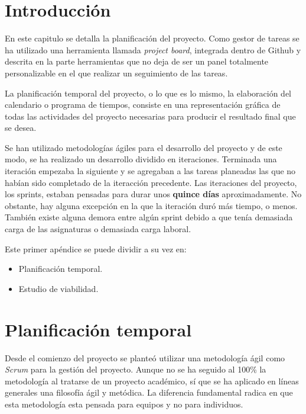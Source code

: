 
\section{Introducción}\label{introduccion-plan}
En este capitulo se detalla la planificación del proyecto. Como gestor de tareas se ha utilizado una herramienta llamada \textit{project board}, integrada dentro de Github y descrita en la parte  herramientas que no deja de ser un panel totalmente personalizable en el que realizar un seguimiento de las tareas. 

La planificación temporal del proyecto, o lo que es lo mismo, la elaboración del calendario o programa de tiempos, consiste en una representación gráfica de todas las actividades del proyecto necesarias para producir el resultado final que se desea.

Se han utilizado metodologías ágiles para el desarrollo del proyecto y de este modo, se ha realizado un desarrollo dividido en iteraciones. Terminada una iteración empezaba la siguiente y se agregaban a las tareas planeadas las que no habían sido completado de la iteracción precedente. Las iteraciones del proyecto, los sprints, estaban pensadas para durar unos \textbf{quince días} aproximadamente. No obstante, hay alguna excepción en la que la iteración duró más tiempo, o menos. También existe alguna demora entre algún sprint debido a que tenía demasiada carga de las asignaturas o demasiada carga laboral.

Este primer apéndice se puede dividir a su vez en:

\begin{itemize}
	\tightlist
	\item
	Planificación temporal.
	\item
	Estudio de viabilidad.
\end{itemize} 


\section{Planificación temporal}\label{planificacion-temporal}
Desde el comienzo del proyecto se planteó utilizar una metodología ágil como
\emph{Scrum} para la gestión del proyecto. Aunque no se ha seguido al 100\% la
metodología al tratarse de un proyecto académico, sí que se ha aplicado
en líneas generales una filosofía ágil y metódica. La diferencia fundamental radica en que esta metodología esta pensada para equipos y no para individuos.

